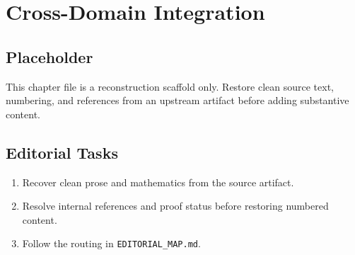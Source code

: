 \chapter{Cross-Domain Integration}
\label{chap:cross-domain-integration}

\section*{Placeholder}
This chapter file is a reconstruction scaffold only. Restore clean source text, numbering, and references from an upstream artifact before adding substantive content.

\section*{Editorial Tasks}
\begin{enumerate}
\item Recover clean prose and mathematics from the source artifact.
\item Resolve internal references and proof status before restoring numbered content.
\item Follow the routing in \texttt{EDITORIAL\_MAP.md}.
\end{enumerate}
